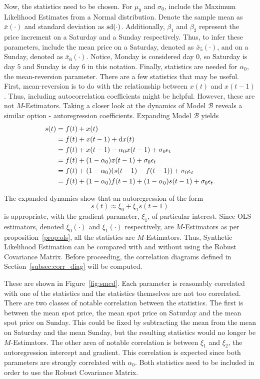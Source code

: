 Now, the statistics need to be chosen. For $\mu_0$ and $\sigma_0$, include the Maximum Likelihood Estimates from a Normal distribution. Denote the sample mean as $\bar{x}(\cdot)$ and standard deviation as $\mathop{}\!\text{sd}{(\cdot)}$. Additionally, $\beta_1$ and $\beta_2$ represent the price increment on a Saturday and a Sunday respectively. Thus, to infer these parameters, include the mean price on a Saturday, denoted as $\bar{x}_5(\cdot)$, and on a Sunday, denoted as $\bar{x}_6(\cdot)$. Notice, Monday is considered day $0$, so Saturday is day $5$ and Sunday is day $6$ in this notation. Finally, statistics are needed for $\alpha_0$, the mean-reversion parameter. There are a few statistics that may be useful. First, mean-reversion is to do with the relationship between $x(t)$ and $x(t-1)$. Thus, including autocorrelation coefficients might be helpful. However, these are not $M$-Estimators. Taking a closer look at the dynamics of Model $\mathcal{B}$ reveals a similar option - autoregression coefficients. Expanding Model $\mathcal{B}$ yields
\begin{align}
    s(t) &= f(t) + x(t) \\
    &= f(t) + x(t-1) + \mathop{}\!\mathrm{d}{x(t)} \\
    &= f(t) + x(t-1) - \alpha_0 x(t-1) + \sigma_0 \epsilon_t \\
    &= f(t) + (1-\alpha_0)x(t-1) + \sigma_0 \epsilon_t \\
    &= f(t) + (1-\alpha_0)(s(t-1) - f(t-1)) + \sigma_0 \epsilon_t \\
    &= f(t) + (1-\alpha_0)f(t-1) + (1-\alpha_0)s(t-1) + \sigma_0 \epsilon_t.
\end{align}

The expanded dynamics show that an autoregression of the form
\begin{equation}
    s(t) \approx \xi_0 + \xi_1 s(t-1)
\end{equation}
is appropriate, with the gradient parameter, $\xi_1$, of particular interest. Since OLS estimators, denoted $\xi_0(\cdot)$ and $\xi_1(\cdot)$ respectively, are $M$-Estimators as per proposition~\ref{prop:ols}, all the statistics are $M$-Estimators. Thus, Synthetic Likelihood Estimation can be compared with and without using the Robust Covariance Matrix. Before proceeding, the correlation diagrams defined in Section~\ref{subsec:corr_diag} will be computed.

These are shown in Figure~\ref{fig:smcd}. Each parameter is reasonably correlated with one of the statistics and the statistics themselves are not too correlated. There are two classes of notable correlation between the statistics. The first is between the mean spot price, the mean spot price on Saturday and the mean spot price on Sunday. This could be fixed by subtracting the mean from the mean on Saturday and the mean Sunday, but the resulting statistics would no longer be $M$-Estimators. The other area of notable correlation is between $\xi_1$ and $\xi_2$, the autoregression intercept and gradient. This correlation is expected since both parameters are strongly correlated with $\alpha_0$. Both statistics need to be included in order to use the Robust Covariance Matrix.

